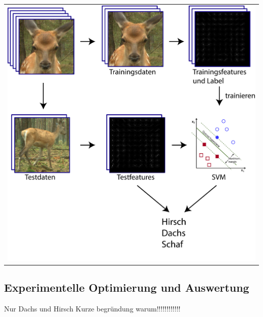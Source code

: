 \begin{center}
\begin{tabular}{c}
\includegraphics[trim={0 0cm 0cm 0cm},clip=true,width=13cm]{img/ClassificationOverview.png}
\end{tabular}
\label{fig:hog_classification_ov}
\end{center}


\subsection{Experimentelle Optimierung und Auswertung} \label{sec:HOG_parameter_and_results}
Nur Dachs und Hirsch
Kurze begründung warum!!!!!!!!!!!! 


